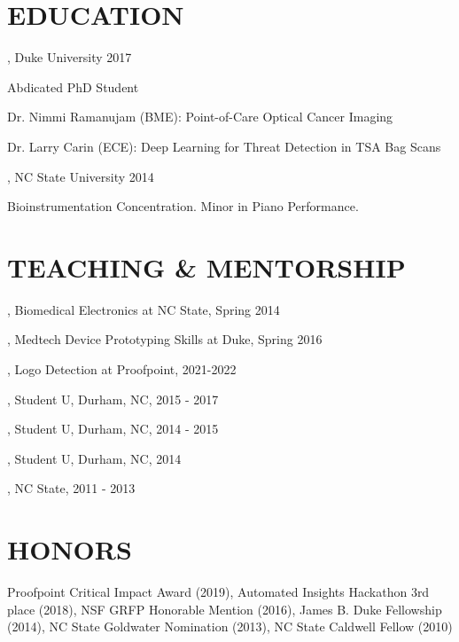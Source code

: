 \documentclass[resmargin, 11pt]{resume_style_class} %
\newenvironment{outline}
  {\begin{list}{}{\setlength{\leftmargin}{30pt}\setlength\itemsep{-2pt}}}
  {\end{list}}
\newenvironment{outline-cond}
  {\begin{list}{}{
  \setlength{\leftmargin}{30pt}
  \setlength\topsep{-10pt}
  \setlength\itemindent{-30pt}
  }}
  {\end{list}}
\begin{document}
\begin{resume}
\section{EDUCATION}

, Duke University \hfill 2017
\begin{outline}
	\item Abdicated PhD Student 
	\item Dr. Nimmi Ramanujam (BME): Point-of-Care Optical Cancer Imaging
	\item Dr. Larry Carin (ECE): Deep Learning for Threat Detection in TSA Bag Scans
\end{outline}

, NC State University \hfill 2014
\begin{outline}
	\item Bioinstrumentation Concentration. Minor in Piano Performance.
\end{outline}


\section{ TEACHING \& MENTORSHIP}
\begin{outline-cond} 
\item {}, Biomedical Electronics at NC State, Spring 2014
\item {}, Medtech Device Prototyping Skills at Duke, Spring 2016
\item {}, Logo Detection at Proofpoint, 2021-2022
\item {}, Student U, Durham, NC, 2015 - 2017
\item {}, Student U, Durham, NC, 2014 - 2015
\item {}, Student U, Durham, NC, 2014
\item {}, NC State, 2011 - 2013  
\end{outline-cond} 


\section{HONORS}
Proofpoint Critical Impact Award (2019),
Automated Insights Hackathon 3rd place (2018),
NSF GRFP Honorable Mention (2016),
James B. Duke Fellowship (2014),
NC State Goldwater Nomination (2013),
NC State Caldwell Fellow (2010)
\end{resume}
\end{document}
